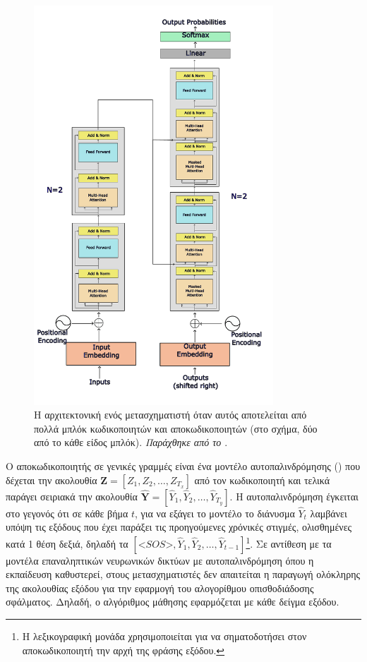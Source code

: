 \begin{figure}[p]
  \centering
  \includegraphics[width=0.8\textwidth]{images/chapter theoritical background/transformer_many_to_many.pdf}
  \caption{Η αρχιτεκτονική ενός μετασχηματιστή \cite{transformers_attention_is_all_you_need} όταν αυτός αποτελείται από πολλά μπλόκ κωδικοποιητών και αποκωδικοποιητών (στο σχήμα, δύο από το κάθε είδος μπλόκ). \textit{Παράχθηκε από το \href{https://inkscape.org/}{}}.}
  \label{fig:transformer_many_many}
\end{figure}

Ο αποκωδικοποιητής σε γενικές γραμμές είναι ένα μοντέλο αυτοπαλινδρόμησης () που δέχεται την ακολουθία $\boldsymbol{Z} = [Z_1, Z_2, \dots, Z_{T_x}]$ από τον κωδικοποιητή και τελικά παράγει σειριακά την ακολουθία $\boldsymbol{\hat{Y}} = [\hat{Y}_1, \hat{Y}_2, \dots, \hat{Y}_{T_y}]$. Η αυτοπαλινδρόμηση έγκειται στο γεγονός ότι σε κάθε βήμα $t$, για να εξάγει το μοντέλο το διάνυσμα $\hat{Y}_t$ λαμβάνει υπόψη τις εξόδους που έχει παράξει τις προηγούμενες χρόνικές στιγμές, ολισθημένες κατά 1 θέση δεξιά, δηλαδή τα $[\mathbin{<}SOS\mathbin{>}, \hat{Y}_1, \hat{Y}_2, \dots, \hat{Y}_{t-1}]$\footnote{Η λεξικογραφική μονάδα  χρησιμοποιείται για να σηματοδοτήσει στον αποκωδικοποιητή την αρχή της φράσης εξόδου.}. Σε αντίθεση με τα μοντέλα επαναληπτικών νευρωνικών δικτύων με αυτο\textendash παλινδρόμηση όπου η εκπαίδευση καθυστερεί, στους μετασχηματιστές δεν απαιτείται η παραγωγή ολόκληρης της ακολουθίας εξόδου για την εφαρμογή του αλογορίθμου οπισθοδιάδοσης σφάλματος. Δηλαδή, ο αλγόριθμος μάθησης εφαρμόζεται με κάθε δείγμα εξόδου.\par

